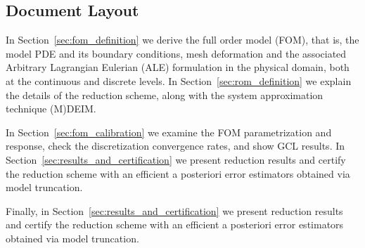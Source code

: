 \documentclass[thesis.tex]{subfiles}
\begin{document}
\subsection{Document Layout}
    In Section~\ref{sec:fom_definition} we derive the full order model (FOM), 
    that is, the model PDE and its boundary conditions, 
    mesh deformation and 
    the associated Arbitrary Lagrangian Eulerian (ALE) formulation
    in the physical domain,
    both at the continuous and discrete levels.
    In Section~\ref{sec:rom_definition} we explain the details of the reduction scheme, 
    along with the system approximation technique (M)DEIM.

    In Section~\ref{sec:fom_calibration} 
    we examine the FOM parametrization and response, 
    check the discretization convergence rates, and show GCL results.
    In Section~\ref{sec:results_and_certification} we present reduction results
    and certify the reduction scheme with an efficient a posteriori error estimators obtained via model truncation.

    Finally, in Section~\ref{sec:results_and_certification} 
    we present reduction results
    and certify the reduction scheme with 
    an efficient a posteriori error estimators obtained via model truncation.
\end{document}
